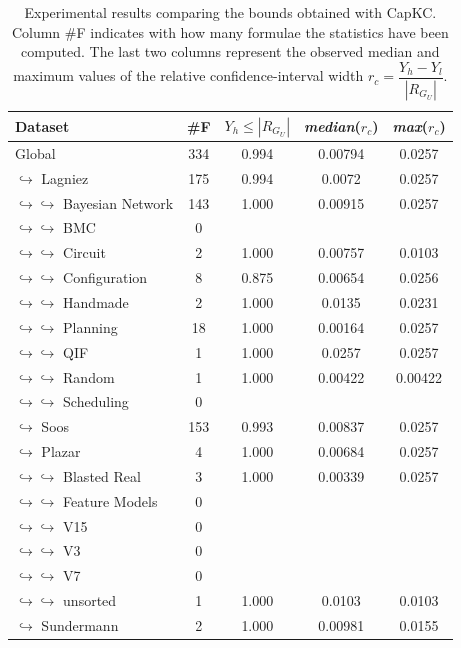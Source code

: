 \documentclass{article}
\newcommand\capkc[0]{CapKC\xspace}
\begin{document}
    
\begin{table}[h!]
        \centering
            \begin{tabular}{l|c|c|c|c}
                Dataset & \#F & $Y_h \leq |R_{G_U}|$ & \textit{median}($r_c$) & \textit{max}($r_c$) \\ 
                \hline 
Global & 334 & 0.994 & 0.00794 & 0.0257 \\
$\hookrightarrow$ Lagniez \cite{D4} & 175 & 0.994 & 0.0072 & 0.0257 \\
$\hookrightarrow \hookrightarrow$ Bayesian Network & 143 & 1.000 & 0.00915 & 0.0257 \\
$\hookrightarrow \hookrightarrow$ BMC & 0 & & & \\
$\hookrightarrow \hookrightarrow$ Circuit & 2 & 1.000 & 0.00757 & 0.0103 \\
$\hookrightarrow \hookrightarrow$ Configuration & 8 & 0.875 & 0.00654 & 0.0256 \\
$\hookrightarrow \hookrightarrow$ Handmade & 2 & 1.000 & 0.0135 & 0.0231 \\
$\hookrightarrow \hookrightarrow$ Planning & 18 & 1.000 & 0.00164 & 0.0257 \\
$\hookrightarrow \hookrightarrow$ QIF & 1 & 1.000 & 0.0257 & 0.0257 \\
$\hookrightarrow \hookrightarrow$ Random & 1 & 1.000 & 0.00422 & 0.00422 \\
$\hookrightarrow \hookrightarrow$ Scheduling & 0 & & & \\
$\hookrightarrow$ Soos \cite{soos_2024_10449477} & 153 & 0.993 & 0.00837 & 0.0257 \\
$\hookrightarrow$ Plazar \cite{Plazar2019} & 4 & 1.000 & 0.00684 & 0.0257 \\
$\hookrightarrow \hookrightarrow$ Blasted Real & 3 & 1.000 & 0.00339 & 0.0257 \\
$\hookrightarrow \hookrightarrow$ Feature Models & 0 & & & \\
$\hookrightarrow \hookrightarrow$ V15 & 0 & & & \\
$\hookrightarrow \hookrightarrow$ V3 & 0 & & & \\
$\hookrightarrow \hookrightarrow$ V7 & 0 & & & \\
$\hookrightarrow \hookrightarrow$ unsorted & 1 & 1.000 & 0.0103 & 0.0103 \\
$\hookrightarrow$ Sundermann \cite{SBK+:SPLC24} & 2 & 1.000 & 0.00981 & 0.0155 \\
            \end{tabular}
        \caption{Experimental results comparing the bounds obtained with \capkc.
        Column \#F indicates with how many formulae the statistics have been computed.
        The last two columns represent the observed median and maximum values of the relative confidence-interval width $r_c = \dfrac{Y_h - Y_l}{|R_{G_U}|}$.
        }
        \label{capkc:tab:coverage}
    \end{table}
\end{document}
